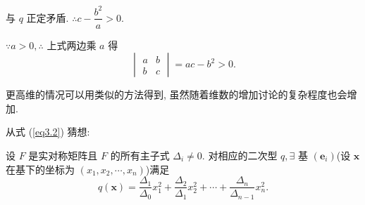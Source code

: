 \documentclass[color=black,device=normal,lang=cn,mode=geye]{elegantnote}
\begin{document}
与 $q$ 正定矛盾. $\therefore c-\dfrac{b^2}{a}>0$.

$\because a>0,\therefore$ 上式两边乘 $a$ 得
\[\begin{vmatrix}
    a & b \\
    b & c
\end{vmatrix}=ac-b^2>0.\]

更高维的情况可以用类似的方法得到, 虽然随着维数的增加讨论的复杂程度也会增加.

从式 (\ref{eq3.2}) 猜想:
\begin{theorem}\label{t3.6}
    设 $F$ 是实对称矩阵且 $F$ 的所有主子式 $\Delta_i\neq0$. 对相应的二次型 $q,\exists$ 基 $(\boldsymbol{e}_i)$(设 $\boldsymbol{x}$ 在基下的坐标为 $(x_1,x_2,\cdots,x_n)$)满足
    \[q(\boldsymbol{x})=\dfrac{\Delta_1}{\Delta_0}x_1^2+\dfrac{\Delta_2}{\Delta_1}x_2^2+\cdots+\dfrac{\Delta_n}{\Delta_{n-1}}x_n^2.\]
\end{theorem}
\end{document}
